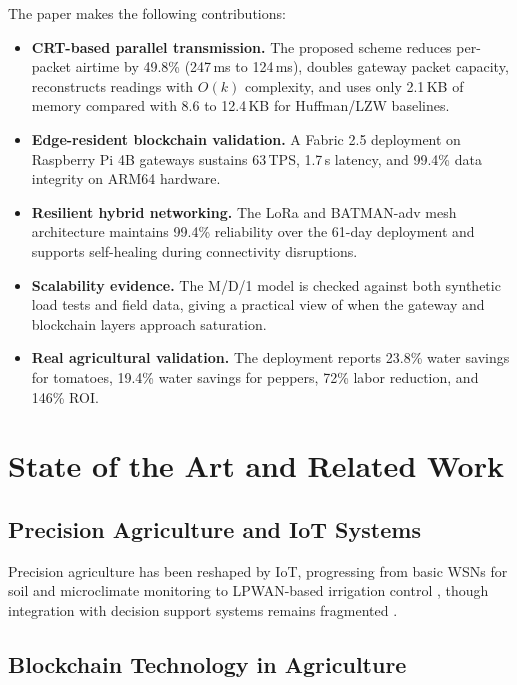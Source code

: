 \documentclass[pdflatex,sn-mathphys-num]{sn-jnl}
\theoremstyle{thmstyleone}
\theoremstyle{thmstyletwo}
\theoremstyle{thmstylethree}
\begin{document}
The paper makes the following contributions:

\begin{itemize}
    \item \textbf{CRT-based parallel transmission.} The proposed scheme reduces per-packet airtime by 49.8\% (247\,ms to 124\,ms), doubles gateway packet capacity, reconstructs readings with $O(k)$ complexity, and uses only 2.1\,KB of memory compared with 8.6 to 12.4\,KB for Huffman/LZW baselines.
    \item \textbf{Edge-resident blockchain validation.} A Fabric 2.5 deployment on Raspberry Pi 4B gateways sustains 63\,TPS, 1.7\,s latency, and 99.4\% data integrity on ARM64 hardware.
    \item \textbf{Resilient hybrid networking.} The LoRa and BATMAN-adv mesh architecture maintains 99.4\% reliability over the 61-day deployment and supports self-healing during connectivity disruptions.
    \item \textbf{Scalability evidence.} The M/D/1 model is checked against both synthetic load tests and field data, giving a practical view of when the gateway and blockchain layers approach saturation.
    \item \textbf{Real agricultural validation.} The deployment reports 23.8\% water savings for tomatoes, 19.4\% water savings for peppers, 72\% labor reduction, and 146\% ROI.
\end{itemize}

\section{State of the Art and Related Work}
\label{sec:related_work}

\subsection{Precision Agriculture and IoT Systems}
\label{subsec:precision_agriculture}

Precision agriculture has been reshaped by IoT, progressing from basic WSNs for soil and microclimate monitoring \cite{wang2006wireless, bogena2010soil, pierce1999site} to LPWAN-based irrigation control \cite{evans2008precision}, though integration with decision support systems remains fragmented \cite{aydin2021comprehensive, zhang2002precision, gebbers2010precision}.

\subsection{Blockchain Technology in Agriculture}
\label{subsec:blockchain_agriculture}
\end{document}
